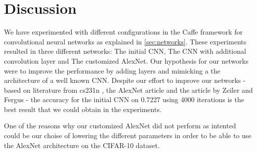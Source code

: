\graphicspath{{Chapters/Project/}}

\section{Discussion} %
\label{sec:discussion}

We have experimented with different configurations in the Caffe framework for
convolutional neural networks as explained in \autoref{sec:networks}. These
experiments resulted in three different networks: The initial CNN, The CNN with
additional convolution layer and The customized AlexNet. Our hypothesis for our
networks were to improve the performance by adding layers and mimicking
a the architecture of a well known CNN. Despite our effort to improve our
networks - based on literature from cs231n \cite{cs231n}, the AlexNet
article\cite{AlexNet} and the article by Zeiler and Fergus \cite{ZeilerFergus} -
the accuracy for the initial CNN on 0.7227 using 4000 iterations is the best result that we could obtain in the experiments.


One of the reasons why our customized AlexNet did not perform as intented could
be our choise of lowering the different parameters in order to be able to use
the AlexNet architecture on the CIFAR-10 dataset. 

